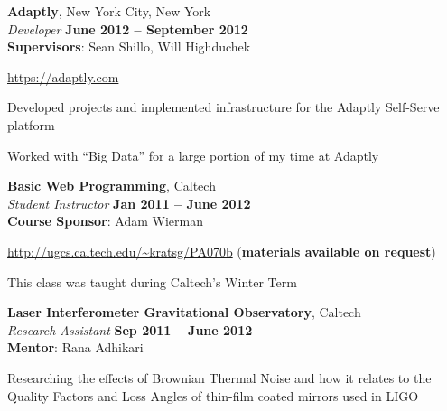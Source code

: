 \documentclass[margin,line]{resume}
\begin{document}
\begin{resume}
	\textbf{Adaptly}, New York City, New York \vspace{2mm}\\\vspace{1mm}%
	\textsl{Developer} \hfill \textbf{June 2012 -- September 2012}\\
	\textbf{Supervisors}: Sean Shillo, Will Highduchek\vspace{-3mm}\\\vspace{-1mm}%
	\begin{list2}
		\item \url{https://adaptly.com}
		\item Developed projects and implemented infrastructure for the Adaptly Self-Serve platform
		\item Worked with ``Big Data'' for a large portion of my time at Adaptly
	\end{list2}

    \pagebreak

    \textbf{Basic Web Programming}, Caltech \vspace{2mm}\\\vspace{1mm}%
    \textsl{Student Instructor} \hfill \textbf{Jan 2011 -- June 2012}\\
    \textbf{Course Sponsor}: Adam Wierman\vspace{-3mm}\\\vspace{-1mm}%
	\begin{list2}
		\item \url{http://ugcs.caltech.edu/~kratsg/PA070b} (\textbf{materials available on request})
		\item This class was taught during Caltech's Winter Term
	\end{list2}

    \textbf{Laser Interferometer Gravitational Observatory}, Caltech \vspace{2mm}\\\vspace{1mm}%
    \textsl{Research Assistant} \hfill \textbf{Sep 2011 -- June 2012}\\
    \textbf{Mentor}: Rana Adhikari\vspace{-3mm}\\\vspace{-1mm}%
	\begin{list2}
		\item Researching the effects of Brownian Thermal Noise and how it relates to the Quality Factors and Loss Angles of thin-film coated mirrors used in LIGO
	\end{list2}


\end{resume}
\end{document}
